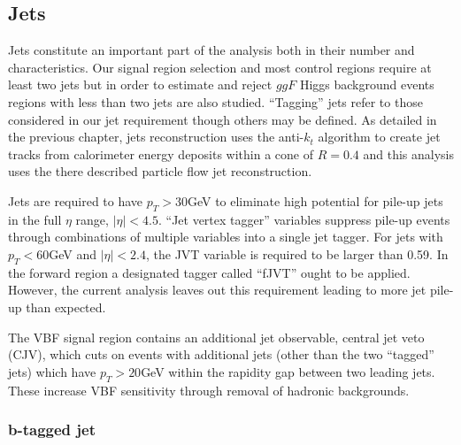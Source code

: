\begin{table}[h]
  \centering
  \caption{Muon selections}
  \label{tab:MuonSelection}
\end{table}


\subsection{Jets}

Jets constitute an important part of the analysis both in their number and characteristics. Our signal region selection and most control regions require at least two jets but in order to estimate and reject $ggF$ Higgs background events regions with less than two jets are also studied. ``Tagging'' jets refer to those considered in our jet requirement though others may be defined. As detailed in the previous chapter, jets reconstruction uses the anti-$k_t$ algorithm to create jet tracks from calorimeter energy deposits within a cone of $R = 0.4$ and this analysis uses the there described particle flow jet reconstruction.   

Jets are required to have $p_T > 30$GeV to eliminate high potential for pile-up jets in the full $\eta$ range, $|\eta| < 4.5$. ``Jet vertex tagger'' variables suppress pile-up events through combinations of multiple variables into a single jet tagger. For jets with $p_T < 60$GeV and $|\eta| < 2.4$, the JVT variable is required to be larger than 0.59. In the forward region a designated tagger called ``fJVT'' ought to be applied. However, the current analysis leaves out this requirement leading to more jet pile-up than expected. 

The VBF signal region contains an additional jet observable, central jet veto (CJV), which cuts on events with additional jets (other than the two ``tagged'' jets) which have $p_T>20$GeV within the rapidity gap between two leading jets. These increase VBF sensitivity through removal of hadronic backgrounds.
\subsubsection{ b-tagged jet}

